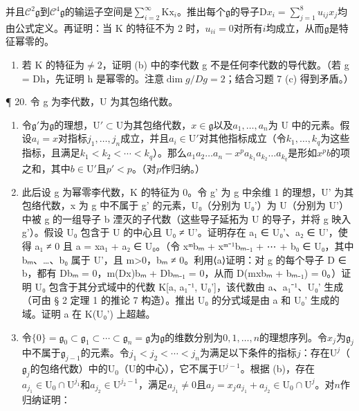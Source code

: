 并且\(\mathcal{C}^2\mathfrak{g}\)到\(\mathcal{C}^4\mathfrak{g}\)的输运子空间是\(\sum_{i=2}^{\infty}\mathrm{Kx}_i\)。推出每个\(\mathfrak{g}\)的导子\(\mathrm{D}x_i = \sum_{j=1}^{8}u_{ij}x_j\)均由公式定义。再证明：当 K 的特征不为 2 时，\(u_{ii} = 0\)对所有\(i\)均成立，从而\(\mathfrak{g}\)是特征幂零的。

\begin{enumerate}
\def\labelenumi{(\alph{enumi})}
\setcounter{enumi}{2}
\tightlist
\item
  若 K 的特征为\(\neq2\)，证明 (b) 中的李代数 g 不是任何李代数的导代数。（若 g = Dh，先证明 h 是幂零的。注意\(\dim g/Dg = 2\)；结合习题 7 (c) 得到矛盾。）
\end{enumerate}

¶ 20. 令 g 为李代数，U 为其包络代数。

\begin{enumerate}
\def\labelenumi{(\alph{enumi})}
\item
  令\(\mathfrak{g}'\)为\(\mathfrak{g}\)的理想，\(\mathrm{U}' \subset \mathrm{U}\)为其包络代数，\(x \in \mathfrak{g}\)以及\(a_1, \ldots, a_n\)为 U 中的元素。假设\(a_i = x\)对指标\(j_1, \ldots, j_n\)成立，并且\(a_i \in \mathrm{U}'\)对其他指标成立（令\(k_1, \ldots, k_q\)为这些指标，且满足\(k_1 < k_2 < \cdots < k_q\)）。那么\(a_1 a_2 \ldots a_n - x^p a_{k_1}a_{k_2} \ldots a_{k_q}\)是形如\(x^p b\)的项之和，其中\(b \in \mathrm{U}'\)且\(p' < p\)。（对\(p\)作归纳。）
\item
  此后设 g 为幂零李代数，K 的特征为 0。令 g' 为 g 中余维 1 的理想，U' 为其包络代数，x 为 g 中不属于 g' 的元素，U₀（分别为 U₀'）为 U（分别为 U'）中被 g 的一组导子 b 湮灭的子代数（这些导子延拓为 U 的导子，并将 g 映入 g'）。假设 U₀ 包含于 U 的中心且 U₀ ≠ U'。证明存在 a₁ ∈ U₀'、a₂ ∈ U'，使得 a₁ ≠ 0 且 a = xa₁ + a₂ ∈ U₀。（令 xᵐbₘ + xᵐ⁻¹bₘ₋₁ + ⋯ + b₀ ∈ U₀，其中 bₘ、\ldots、b₀ 属于 U'，且 m\textgreater{}0，bₘ ≠ 0。利用⟨a⟩证明：对 g 的每个导子 D ∈ b，都有 Dbₘ = 0，m(Dx)bₘ + Dbₘ₋₁ = 0，从而 D(mxbₘ + bₘ₋₁) = 0。）证明 U₀ 包含于其分式域中的代数 K{[}a, a₁⁻¹, U₀'{]}，该代数由 a、a₁⁻¹、U₀' 生成（可由 § 2 定理 1 的推论 7 构造）。推出 U₀ 的分式域是由 a 和 U₀' 生成的域。证明 a 在 K(U₀') 上超越。
\item
 令\(\{0\} = \mathfrak{g}_0 \subset \mathfrak{g}_1 \subset \cdots \subset \mathfrak{g}_n = \mathfrak{g}\)为\(\mathfrak{g}\)的维数分别为\(0, 1, \ldots, n\)的理想序列。令\(x_j\)为\(\mathfrak{g}_j\)中不属于\(\mathfrak{g}_{j-1}\)的元素。令\(j_1 < j_2 < \cdots < j_n\)为满足以下条件的指标\(j\)：存在\(\mathrm{U}^j\)（\(\mathfrak{g}_j\)的包络代数）中的\(\mathrm{U}_0\)（\(\mathrm{U}\)的中心），它不属于\(\mathrm{U}^{j-1}\)。根据 (b)，存在\(a_{j_1} \in \mathrm{U}_0 \cap \mathrm{U}^{j_1}\)和\(a_{j_2} \in \mathrm{U}^{j_2-1}\)，满足\(a_{j_1} \neq 0\)且\(a_j = x_j a_{j_1} + a_{j_2} \in \mathrm{U}_0 \cap \mathrm{U}^{j}\)。对\(n\)作归纳证明：
\end{enumerate}

